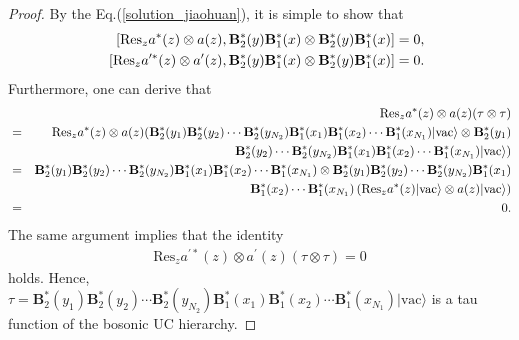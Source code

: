 \documentclass[11pt,reqno]{amsart}
\numberwithin{equation}{section}
\begin{document}
\begin{proof}
By the Eq.(\ref{solution_jiaohuan}), it is simple to show that
\begin{eqnarray}
&&\left[\text{Res}_{z}a^{\ast}(z)\otimes a(z),\mathbf{B}^{\ast}_{2}(y)\mathbf{B}^{\ast}_{1}(x)\otimes\mathbf{B}^{\ast}_{2}(y)
\mathbf{B}^{\ast}_{1}(x)\right]=0,\notag\\
&&\left[\text{Res}_{z}a^{\prime\ast}(z)\otimes a^{\prime}(z),\mathbf{B}^{\ast}_{2}(y)\mathbf{B}^{\ast}_{1}(x)\otimes\mathbf{B}^{\ast}_{2}(y)
\mathbf{B}^{\ast}_{1}(x)\right]=0.
\end{eqnarray}
Furthermore, one can derive that
\begin{eqnarray}
&&\text{Res}_{z}a^{\ast}(z)\otimes a(z)(\tau\otimes\tau)\notag\\
&=&\text{Res}_{z}a^{\ast}(z)\otimes a(z)(\mathbf{B}^{\ast}_{2}(y_{1})\mathbf{B}^{\ast}_{2}(y_{2})\cdots
\mathbf{B}^{\ast}_{2}(y_{N_{2}})\mathbf{B}^{\ast}_{1}(x_{1})
\mathbf{B}^{\ast}_{1}(x_{2})\cdots\mathbf{B}^{\ast}_{1}(x_{N_{1}})|\text{vac}
\rangle\otimes\mathbf{B}^{\ast}_{2}(y_{1})\notag\\
&&\mathbf{B}^{\ast}_{2}(y_{2})\cdots
\mathbf{B}^{\ast}_{2}(y_{N_{2}})\mathbf{B}^{\ast}_{1}(x_{1})
\mathbf{B}^{\ast}_{1}(x_{2})\cdots\mathbf{B}^{\ast}_{1}(x_{N_{1}})|
\text{vac}\rangle)\notag\\
&=&\mathbf{B}^{\ast}_{2}(y_{1})\mathbf{B}^{\ast}_{2}(y_{2})\cdots
\mathbf{B}^{\ast}_{2}(y_{N_{2}})\mathbf{B}^{\ast}_{1}(x_{1})
\mathbf{B}^{\ast}_{1}(x_{2})\cdots\mathbf{B}^{\ast}_{1}(x_{N_{1}})\otimes
\mathbf{B}^{\ast}_{2}(y_{1})\mathbf{B}^{\ast}_{2}(y_{2})\cdots
\mathbf{B}^{\ast}_{2}(y_{N_{2}})\mathbf{B}^{\ast}_{1}(x_{1})\notag\\
&&\mathbf{B}^{\ast}_{1}(x_{2})\cdots\mathbf{B}^{\ast}_{1}(x_{N_{1}})
\left(\text{Res}_{z}a^{\ast}(z)|\text{vac}\rangle\otimes a(z)|\text{vac}\rangle\right)\notag\\
&=&0.
\end{eqnarray}
The same argument implies that the identity
\begin{eqnarray}
\text{Res}_{z}a^{\prime\ast}(z)\otimes a^{\prime}(z)(\tau\otimes\tau)=0
\end{eqnarray}
holds. Hence, $\tau=\mathbf{B}^{\ast}_{2}(y_{1})\mathbf{B}^{\ast}_{2}(y_{2})\cdots
\mathbf{B}^{\ast}_{2}(y_{N_{2}})\mathbf{B}^{\ast}_{1}(x_{1})
\mathbf{B}^{\ast}_{1}(x_{2})\cdots\mathbf{B}^{\ast}_{1}(x_{N_{1}})|\text{vac}\rangle$ is a tau function of  the bosonic UC hierarchy.
\end{proof}
\end{document}
